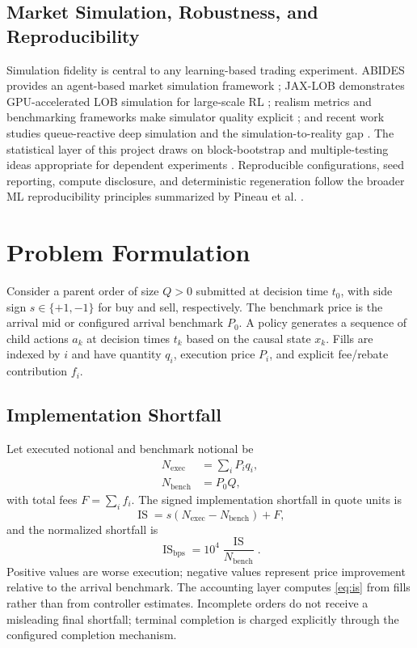 \documentclass[journal,10pt]{IEEEtran}
\newcommand{\1}{\mathbf{1}}
\newcommand{\IS}{\operatorname{IS}}
\begin{document}
\subsection{Market Simulation, Robustness, and Reproducibility}
Simulation fidelity is central to any learning-based trading experiment. ABIDES provides an agent-based market simulation framework \cite{ByrdHybinetteBalch2019}; JAX-LOB demonstrates GPU-accelerated LOB simulation for large-scale RL \cite{FreyLiNagy2023}; realism metrics and benchmarking frameworks make simulator quality explicit \cite{VyetrenkoByrdPetosa2020,NagyFreyLi2025}; and recent work studies queue-reactive deep simulation and the simulation-to-reality gap \cite{BodorCarlier2025,NobleRosenbaumSouilmi2026}. The statistical layer of this project draws on block-bootstrap and multiple-testing ideas appropriate for dependent experiments \cite{PolitisRomano1994,White2000,RomanoWolf2005}. Reproducible configurations, seed reporting, compute disclosure, and deterministic regeneration follow the broader ML reproducibility principles summarized by Pineau et al. \cite{PineauVincentLamarreSinhaLariviere2021}.

\section{Problem Formulation}
\label{sec:problem}
Consider a parent order of size $Q>0$ submitted at decision time $t_0$, with side sign $s\in\{+1,-1\}$ for buy and sell, respectively. The benchmark price is the arrival mid or configured arrival benchmark $P_0$. A policy generates a sequence of child actions $a_k$ at decision times $t_k$ based on the causal state $x_k$. Fills are indexed by $i$ and have quantity $q_i$, execution price $P_i$, and explicit fee/rebate contribution $f_i$.

\subsection{Implementation Shortfall}
Let executed notional and benchmark notional be
\begin{align}
N_{\mathrm{exec}} &= \sum_i P_i q_i, \\
N_{\mathrm{bench}} &= P_0 Q,
\end{align}
with total fees $F=\sum_i f_i$. The signed implementation shortfall in quote units is
\begin{equation}
\IS = s\left(N_{\mathrm{exec}}-N_{\mathrm{bench}}\right)+F,
\label{eq:is}
\end{equation}
and the normalized shortfall is
\begin{equation}
\IS_{\mathrm{bps}}=10^4\frac{\IS}{N_{\mathrm{bench}}}.
\label{eq:is-bps}
\end{equation}
Positive values are worse execution; negative values represent price improvement relative to the arrival benchmark. The accounting layer computes \cref{eq:is} from fills rather than from controller estimates. Incomplete orders do not receive a misleading final shortfall; terminal completion is charged explicitly through the configured completion mechanism.
\end{document}

